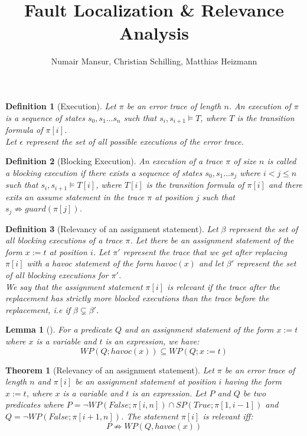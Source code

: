 \documentclass{article}
\title{Fault Localization \& Relevance Analysis \\ }
\author{Numair Mansur, Christian Schilling, Matthias Heizmann}
\affil{University of Freiburg, Germany}
\newcommand{\limp}{\Rightarrow}
\newtheorem{mydef}{Definition}
\newtheorem{theorem}{Theorem}
\newtheorem{lemma}{Lemma}
\begin{document}
\maketitle
\begin{mydef}[Execution]\label{mydef:execution_definition}
Let $\pi$ be an error trace of length $n$. An execution of $\pi$ is a sequence of states $s_0, s_1...s_n$ such that $s_i, s_{i+1} \models T$, where $T$ is the transition formula of $\pi[i]$. \\
Let $\epsilon$ represent the set of all possible executions of the error trace.
\end{mydef}

\begin{mydef}[Blocking Execution]\label{mydef:blockingexecution_definition}
An execution of a trace $\pi$ of size $n$ is called a blocking execution if there exists a sequence of states $s_0, s_1...s_j$ where $i<j \leq n$ such that $s_i, s_{i+1} \models T[i]$, where $T[i]$ is the transition formula of $\pi[i]$ and there exits an assume statement in the trace $\pi$ at position $j$ such that $s_{j} \not \limp guard(\pi[j])$.
\end{mydef}

\begin{mydef}[Relevancy of an assignment statement]\label{mydef:relevancy_definition}
Let $\beta$ represent the set of all blocking executions of a trace $\pi$. Let there be an assignment statement of the form $x:=t$ at position $i$. Let $\pi'$ represent the trace that we get after replacing $\pi[i]$ with a havoc statement of the form $havoc(x)$ and let $\beta'$ represent the set of all blocking executions for $\pi'$.\\
We say that the assignment statement $\pi[i]$ is relevant if the trace after the replacement has strictly more blocked executions than the trace before the replacement, i.e if $\beta \subsetneq \beta'$. 
\end{mydef}

\begin{lemma}[]\label{lemma:rel_bw_assignment_and_havoc}
For a predicate $Q$ and an assignment statement of the form $x:=t$ where $x$ is a variable and $t$ is an expression, we have:
$$WP(Q; havoc(x)) \subseteq WP(Q; x:=t)$$
\end{lemma}

\newpage

\begin{theorem}[Relevancy of an assignment statement]\label{mydef:relevancytheorem}
Let $\pi$ be an error trace of length $n$ and $\pi[i]$ be an assignment statement at position $i$ having the form $x:=t$, where $x$ is a variable and $t$ is an expression. Let $P$ and $Q$ be two predicates where $P = \neg WP(False; \pi[i,n]) \cap SP(True; \pi[1, i-1])$ and $Q =  \neg WP(False; \pi[i+1,n])$. The statement $\pi[i]$ is relevant iff:
 $$P \not \limp WP(Q,havoc(x))$$
\end{theorem}
\end{document}

